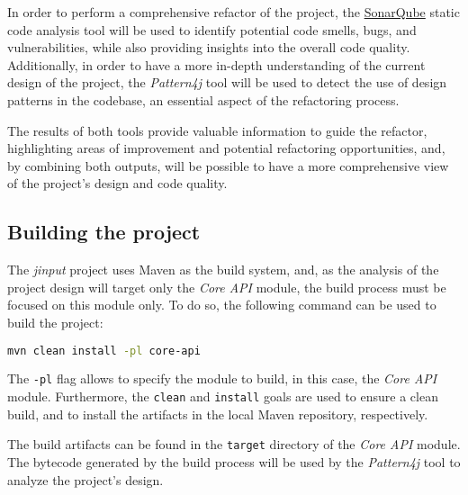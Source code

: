 In order to perform a comprehensive refactor of the project, the \href{https://www.sonarsource.com/}{SonarQube} static code analysis tool will be used to identify potential code smells, bugs, and vulnerabilities, while also providing insights into the overall code quality. Additionally, in order to have a more in-depth understanding of the current design of the project, the \textit{Pattern4j} tool will be used to detect the use of design patterns in the codebase, an essential aspect of the refactoring process.

The results of both tools provide valuable information to guide the refactor, highlighting areas of improvement and potential refactoring opportunities, and, by combining both outputs, will be possible to have a more comprehensive view of the project's design and code quality.

\subsection{Building the project}

The \emph{jinput} project uses Maven as the build system, and, as the analysis of the project design will target only the \emph{Core API} module, the build process must be focused on this module only. To do so, the following command can be used to build the project:

\begin{center}
	\begin{minipage}{0.5\textwidth}
		\begin{lstlisting}[language=bash, caption={Building the project using Maven}]
    mvn clean install -pl core-api
  \end{lstlisting}
	\end{minipage}
\end{center}

\noindent The \texttt{-pl} flag allows to specify the module to build, in this case, the \emph{Core API} module. Furthermore, the \texttt{clean} and \texttt{install} goals are used to ensure a clean build, and to install the artifacts in the local Maven repository, respectively.

The build artifacts can be found in the \texttt{target} directory of the \emph{Core API} module. The bytecode generated by the build process will be used by the \textit{Pattern4j} tool to analyze the project's design.
